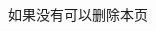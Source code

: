 
\begin{achievements}

\begin{bibliolist}{00}
  \item 如果没有可以删除本页

\end{bibliolist}


\end{achievements}
